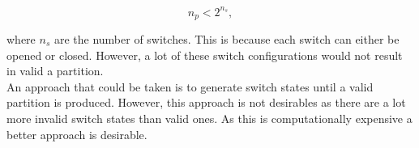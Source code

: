 \begin{equation}
    n_p < 2^{n_s},
    \label{eq:sw_exp:upper_bound1}
\end{equation}

where $n_{s}$ are the number
of switches. This is because each switch can either be opened or closed. However,
a lot of these switch configurations would not result in valid a partition.\\
An approach that could be taken is to generate switch states until a valid
partition is produced. However, this approach is not desirables as
there are a lot more invalid switch states than valid ones. As this
is computationally expensive a better approach is desirable.
